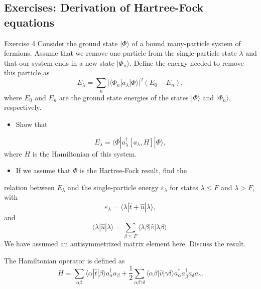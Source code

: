 \documentclass[%
twoside,                 %
final,                   %
10pt]{article}
\begin{document}
\subsection{Exercises: Derivation of Hartree-Fock equations}
\begin{block}{Exercise 4  }
Consider the ground state $|\Phi\rangle$ 
of a bound many-particle system of fermions. Assume that we remove one particle
from the single-particle state $\lambda$ and that our system ends in a new state
$|\Phi_{n}\rangle$. 
Define the energy needed to remove this particle as
\[
E_{\lambda}=\sum_{n}\vert\langle\Phi_{n}|a_{\lambda}|\Phi\rangle\vert^{2}(E_{0}-E_{n}),
\]
where $E_{0}$ and $E_{n}$  are the ground state energies of the states
$|\Phi\rangle$  and  $|\Phi_{n}\rangle$, respectively.
\begin{itemize}
 \item Show that
\end{itemize}

\noindent
\[
E_{\lambda}=\langle\Phi|a_{\lambda}^{\dagger}\left[
a_{\lambda},H \right]|\Phi\rangle,
\]
where $H$ is the Hamiltonian of this system.
\begin{itemize}
 \item If we assume that $\Phi$ is the  Hartree-Fock result, find the 
\end{itemize}

\noindent
relation between $E_{\lambda}$ and the single-particle energy
$\varepsilon_{\lambda}$
for states $\lambda \leq F$ and $\lambda >F$, with
\[
\varepsilon_{\lambda}=\langle\lambda|\hat{t}+\hat{u}|\lambda\rangle,
\]
and
\[
\langle\lambda|\hat{u}|\lambda\rangle=\sum_{\beta \leq F}
\langle\lambda\beta|\hat{v}|\lambda\beta\rangle.
\]
We have assumed an antisymmetrized matrix element here.
Discuss the result.

The Hamiltonian operator is defined as
\[
H=\sum_{\alpha\beta}\langle\alpha|\hat{t}|\beta\rangle a_{\alpha}^{\dagger}a_{\beta}+
\frac{1}{2}\sum_{\alpha\beta\gamma\delta}\langle\alpha\beta|\hat{v}|\gamma\delta\rangle a_{\alpha}^{\dagger}a_{\beta}^{\dagger}a_{\delta}a_{\gamma}.
\]
\end{block}


\end{document}
